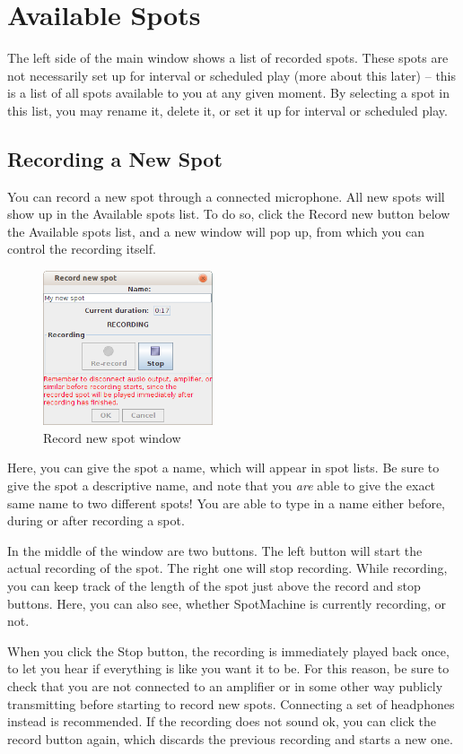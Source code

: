 \documentclass[a4paper,12pt]{report}
\begin{document}
\section{Available Spots}
The left side of the main window shows a list of recorded spots. These spots are
not necessarily set up for interval or scheduled play (more about this later) --
this is a list of all spots available to you at any given moment. By selecting a
spot in this list, you may rename it, delete it, or set it up for interval or
scheduled play.

\subsection{Recording a New Spot}
You can record a new spot through a connected microphone. All new spots will
show up in the Available spots list. To do so, click the Record new button below
the Available spots list, and a new window will pop up, from which you can
control the recording itself.

\begin{figure}[h]
\centering \includegraphics[width=50mm]{recorddialogue.png}
\caption{Record new spot window}
\end{figure}

Here, you can give the spot a name, which will appear in spot lists. Be sure to
give the spot a descriptive name, and note that you {\em are} able to give the
exact same name to two different spots! You are able to type in a name either
before, during or after recording a spot.

In the middle of the window are two buttons. The left button will start the
actual recording of the spot. The right one will stop recording. While
recording, you can keep track of the length of the spot just above the record
and stop buttons. Here, you can also see, whether SpotMachine is currently
recording, or not.

When you click the Stop button, the recording is immediately played back once,
to let you hear if everything is like you want it to be. For this reason, be
sure to check that you are not connected to an amplifier or in some other way
publicly transmitting before starting to record new spots. Connecting a set of
headphones instead is recommended. If the recording does not sound ok, you can
click the record button again, which discards the previous recording and starts
a new one.
\end{document}
